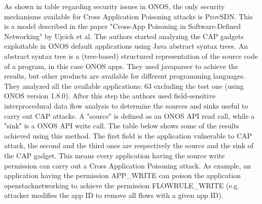 \documentclass[a4paper,10pt]{memoir}
\begin{document}
As shown in table regarding security issues in ONOS, the only security mechanisms available for Cross Application Poisoning attacks is ProvSDN. This is a model described in the paper "Cross-App Poisoning in Software-Defined Networking" by Ujcich et al. The authors started analyzing the CAP gadgets exploitable in ONOS default applications using Java abstract syntax trees. An abstract syntax tree is a (tree-based) structured representation of the source code of a program, in this case ONOS apps. They used javaparser to achieve the results, but other products are available for different programming languages. They analyzed all the available applications: 63 excluding the test one (using ONOS version 1.8.0). After this step the authors used field-sensitive interprocedural data flow
analysis to determine the sources and sinks useful to carry out CAP attacks. A "source" is defined as an ONOS API read call, while a "sink" is a ONOS API write call. The table below shows some of the results achieved using this method. The first field is the application vulnerable to CAP attack, the second and the third ones are respectively the source and the sink of the CAP gadget. This means every application having the source write permission can carry out a Cross Application Poisoning attack. As example, an application having the permission APP\_WRITE can poison the application openstacknetworking to achieve the permission FLOWRULE\_WRITE (e.g. attacker modifies the app ID to remove all flows with a given app ID). 
\end{document}
